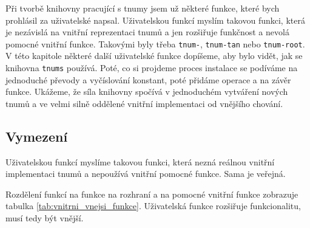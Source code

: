 Při tvorbě knihovny pracující s tnumy jsem už některé funkce, které bych prohlásil za uživatelské napsal. Uživatelskou funkcí myslím takovou funkci, která je nezávislá na vnitřní reprezentaci tnumů a jen rozšiřuje funkčnost a nevolá pomocné vnitřní funkce. Takovými byly třeba \texttt{tnum-}, \texttt{tnum-tan} nebo \texttt{tnum-root}. V této kapitole některé další uživatelské funkce dopíšeme, aby bylo vidět, jak se knihovna \texttt{tnums} používá. Poté, co si projdeme proces instalace se podíváme na jednoduché převody a vyčíslování konstant, poté přidáme operace a na závěr funkce. Ukážeme, že síla knihovny spočívá v jednoduchém vytváření nových tnumů a ve velmi silně oddělené vnitřní implementaci od vnějšího chování.

\subsection{Vymezení}
\begin{definition}
Uživatelskou funkcí myslíme takovou funkci, která nezná reálnou vnitřní implementaci tnumů a nepoužívá vnitřní pomocné funkce. Sama je veřejná.
\end{definition}

Rozdělení funkcí na funkce na rozhraní a na pomocné vnitřní funkce zobrazuje tabulka \ref{tab:vnitrni_vnejsi_funkce}. Uživatelská funkce rozšiřuje funkcionalitu, musí tedy být vnější.

